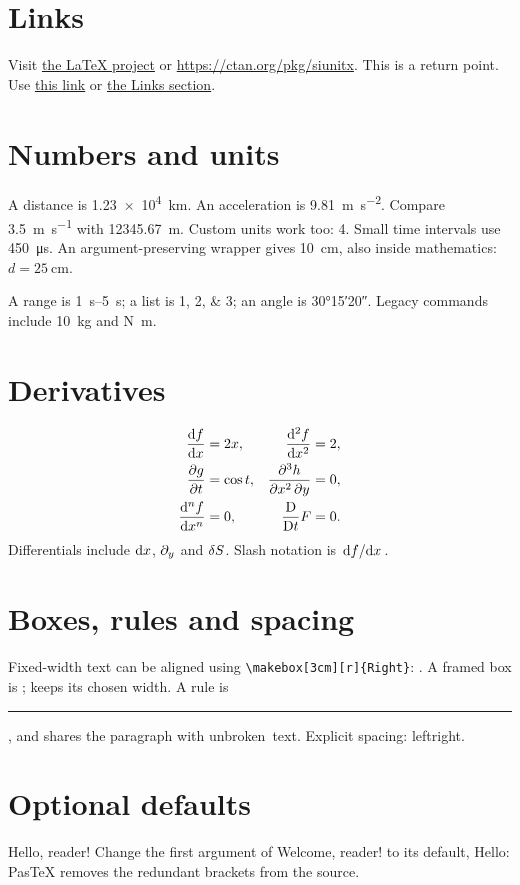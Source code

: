 \documentclass[12pt]{article}
\newcommand{\greeting}[2][Hello]{#1, #2!}
\newcommand{\qtycm}[1]{\qty{#1}{\centi\metre}}
\begin{document}
\section{Links}\label{sec:links}
Visit \href{https://www.latex-project.org/}{the \LaTeX{} project} or
\url{https://ctan.org/pkg/siunitx}.
\hypertarget{start}{This is a return point.}
Use \hyperlink{start}{this link} or \hyperref[sec:links]{the Links section}.

\section{Numbers and units}
A distance is \qty{1.23e4}{\kilo\metre}.
An acceleration is \qty{9.81}{\metre\per\second\squared}.
Compare \qty[per-mode=fraction]{3.5}{\metre\per\second} with
\qty[locale=DE]{12345.67}{\metre}.
Custom units work too: \qty{4}{\widget}.
Small time intervals use \qty{450}{\micro\second}.
An argument-preserving wrapper gives \qtycm{10}, also inside mathematics:
$d=\qtycm{25}$.

A range is \qtyrange{1}{5}{\second}; a list is \numlist{1;2;3};
an angle is \ang{30;15;20}.
Legacy commands include \SI{10}{\kilogram} and \si{\newton\metre}.

\section{Derivatives}
\begin{align*}
  \odv{f}{x} &= 2x, & \odv[order=2]{f}{x} &= 2, \\
  \pdv{g}{t} &= \cos t, & \pdv[order={2,1}]{h}{x,y} &= 0, \\
  \odv[order=n]{f}{x} &= 0, & \mdv*{F}{t} &= 0.
\end{align*}
Differentials include $\odif{x}$, $\pdif{y}$ and $\fdif{S}$.
Slash notation is $\odv{f}/{x}$.

\section{Boxes, rules and spacing}
Fixed-width text can be aligned using \verb|\makebox[3cm][r]{Right}|:
. A framed box is ;
 keeps its chosen width.
A rule is \rule[2pt]{2cm}{0.6pt}, and 
shares the paragraph with \mbox{unbroken text}.
\noindent Explicit spacing: left\hspace{1em}right.

\section{Optional defaults}
\greeting{reader}
Change the first argument of \greeting[Welcome]{reader} to its default,
Hello: PasTeX removes the redundant brackets from the source.
\end{document}

